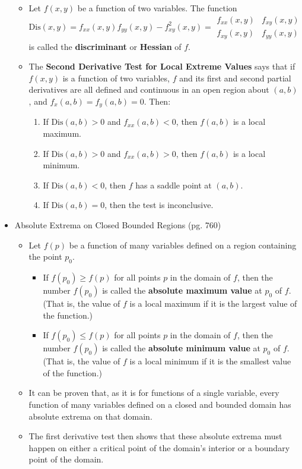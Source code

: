 \documentclass[12pt]{article}
\theoremstyle{plain}
\theoremstyle{definition}
\theoremstyle{remark}
\begin{document}
\begin{itemize}
		\begin{itemize}
		\item Let $f(x,y)$ be a function of two variables. The function \[\textrm{Dis}(x,y)=f_{xx}(x,y)f_{yy}(x,y)-f_{xy}^2(x,y)=\begin{array}{|cc|}f_{xx}(x,y)&f_{xy}(x,y)\\f_{xy}(x,y)&f_{yy}(x,y)\end{array}\] is called the \textbf{discriminant} or \textbf{Hessian} of $f$.
		\item The \textbf{Second Derivative Test for Local Extreme Values} says that if $f(x,y)$ is a function of two variables, $f$ and its first and second partial derivatives are all defined and continuous in an open region about $(a,b)$, and $f_x(a,b)=f_y(a,b)=0$. Then:
			\begin{enumerate}
			\item If $\textrm{Dis}(a,b)>0$ and $f_{xx}(a,b)<0$, then $f(a,b)$ is a local maximum.
			\item If $\textrm{Dis}(a,b)>0$ and $f_{xx}(a,b)>0$, then $f(a,b)$ is a local minimum.
			\item If $\textrm{Dis}(a,b)<0$, then $f$ has a saddle point at $(a,b)$.
			\item If $\textrm{Dis}(a,b)=0$, then the test is inconclusive.
			\end{enumerate}
		\end{itemize}
		
	\item Absolute Extrema on Closed Bounded Regions (pg. 760)
	
		\begin{itemize}
		\item Let $f(p)$ be a function of many variables defined on a region containing the point $p_0$.
			\begin{itemize}
			\item If $f(p_0)\geq f(p)$ for all points $p$ in the domain of $f$, then the number $f(p_0)$ is called the \textbf{absolute maximum value} at $p_0$ of $f$. (That is, the value of $f$ is a local maximum if it is the largest value of the function.)
			\item If $f(p_0)\leq f(p)$ for all points $p$ in the domain of $f$, then the number $f(p_0)$ is called the \textbf{absolute minimum value} at $p_0$ of $f$. (That is, the value of $f$ is a local minimum if it is the smallest value of the function.)
			\end{itemize}
		\item It can be proven that, as it is for functions of a single variable, every function of many variables defined on a closed and bounded domain has absolute extrema on that domain.
		\item The first derivative test then shows that these absolute extrema must happen on either a critical point of the domain's interior or a boundary point of the domain.
		\end{itemize}
		

\end{itemize}
\end{document}
